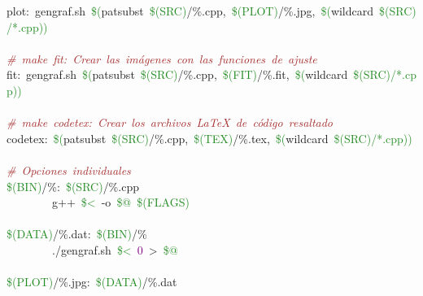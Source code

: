 \mbox{}\textcolor{BrickRed}{plot:}\ gengraf.sh\ \textcolor{ForestGreen}{\$(}patsubst\ \textcolor{ForestGreen}{\$(SRC)}\textcolor{BrickRed}{/\%}.cpp\textcolor{BrickRed}{,}\ \textcolor{ForestGreen}{\$(PLOT)}\textcolor{BrickRed}{/\%}.jpg\textcolor{BrickRed}{,}\ \textcolor{ForestGreen}{\$(}wildcard\ \textcolor{ForestGreen}{\$(SRC)/*.cpp))} \\
\mbox{} \\
\mbox{}\textit{\textcolor{Brown}{\#\ make\ fit:\ Crear\ las\ imágenes\ con\ las\ funciones\ de\ ajuste}} \\
\mbox{}\textcolor{BrickRed}{fit:}\ gengraf.sh\ \textcolor{ForestGreen}{\$(}patsubst\ \textcolor{ForestGreen}{\$(SRC)}\textcolor{BrickRed}{/\%}.cpp\textcolor{BrickRed}{,}\ \textcolor{ForestGreen}{\$(FIT)}\textcolor{BrickRed}{/\%}.fit\textcolor{BrickRed}{,}\ \textcolor{ForestGreen}{\$(}wildcard\ \textcolor{ForestGreen}{\$(SRC)/*.cpp))} \\
\mbox{} \\
\mbox{}\textit{\textcolor{Brown}{\#\ make\ codetex:\ Crear\ los\ archivos\ LaTeX\ de\ código\ resaltado}} \\
\mbox{}\textcolor{BrickRed}{codetex:}\ \textcolor{ForestGreen}{\$(}patsubst\ \textcolor{ForestGreen}{\$(SRC)}\textcolor{BrickRed}{/\%}.cpp\textcolor{BrickRed}{,}\ \textcolor{ForestGreen}{\$(TEX)}\textcolor{BrickRed}{/\%}.tex\textcolor{BrickRed}{,}\ \textcolor{ForestGreen}{\$(}wildcard\ \textcolor{ForestGreen}{\$(SRC)/*.cpp))} \\
\mbox{} \\
\mbox{}\textit{\textcolor{Brown}{\#\ Opciones\ individuales\ }} \\
\mbox{}\textcolor{ForestGreen}{\$(BIN)}\textcolor{BrickRed}{/\%:}\ \textcolor{ForestGreen}{\$(SRC)}\textcolor{BrickRed}{/\%}.cpp \\
\mbox{}\ \ \ \ \ \ \ \ g\textcolor{BrickRed}{++}\ \textcolor{ForestGreen}{\$\textless{}}\ -o\ \textcolor{ForestGreen}{\$@}\ \textcolor{ForestGreen}{\$(FLAGS)} \\
\mbox{} \\
\mbox{}\textcolor{ForestGreen}{\$(DATA)}\textcolor{BrickRed}{/\%}.dat\textcolor{BrickRed}{:}\ \textcolor{ForestGreen}{\$(BIN)}\textcolor{BrickRed}{/\%} \\
\mbox{}\ \ \ \ \ \ \ \ \textcolor{BrickRed}{.}/gengraf.sh\ \textcolor{ForestGreen}{\$\textless{}}\ \textcolor{Purple}{0}\ \textcolor{BrickRed}{\textgreater{}}\ \textcolor{ForestGreen}{\$@} \\
\mbox{} \\
\mbox{}\textcolor{ForestGreen}{\$(PLOT)}\textcolor{BrickRed}{/\%}.jpg\textcolor{BrickRed}{:}\ \textcolor{ForestGreen}{\$(DATA)}\textcolor{BrickRed}{/\%}.dat \\
